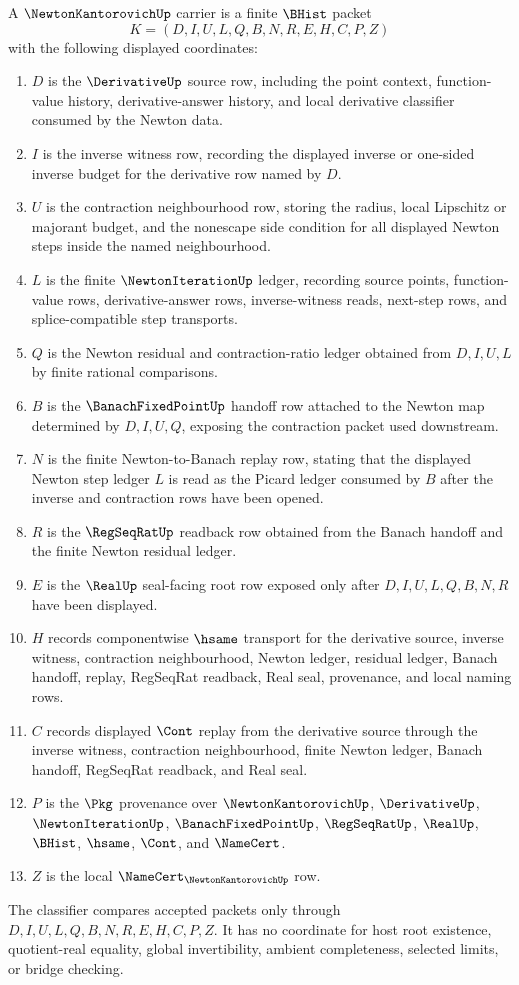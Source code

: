 \begin{definition}
\label{def:newton-kantorovich-carrier}
A $\NewtonKantorovichUp$ carrier is a finite $\BHist$ packet
$$
K=(D,I,U,L,Q,B,N,R,E,H,C,P,Z)
$$
with the following displayed coordinates:
\begin{enumerate}
\item $D$ is the $\DerivativeUp$ source row, including the point context, function-value history, derivative-answer history, and local derivative classifier consumed by the Newton data.
\item $I$ is the inverse witness row, recording the displayed inverse or one-sided inverse budget for the derivative row named by $D$.
\item $U$ is the contraction neighbourhood row, storing the radius, local Lipschitz or majorant budget, and the nonescape side condition for all displayed Newton steps inside the named neighbourhood.
\item $L$ is the finite $\NewtonIterationUp$ ledger, recording source points, function-value rows, derivative-answer rows, inverse-witness reads, next-step rows, and splice-compatible step transports.
\item $Q$ is the Newton residual and contraction-ratio ledger obtained from $D,I,U,L$ by finite rational comparisons.
\item $B$ is the $\BanachFixedPointUp$ handoff row attached to the Newton map determined by $D,I,U,Q$, exposing the contraction packet used downstream.
\item $N$ is the finite Newton-to-Banach replay row, stating that the displayed Newton step ledger $L$ is read as the Picard ledger consumed by $B$ after the inverse and contraction rows have been opened.
\item $R$ is the $\RegSeqRatUp$ readback row obtained from the Banach handoff and the finite Newton residual ledger.
\item $E$ is the $\RealUp$ seal-facing root row exposed only after $D,I,U,L,Q,B,N,R$ have been displayed.
\item $H$ records componentwise $\hsame$ transport for the derivative source, inverse witness, contraction neighbourhood, Newton ledger, residual ledger, Banach handoff, replay, RegSeqRat readback, Real seal, provenance, and local naming rows.
\item $C$ records displayed $\Cont$ replay from the derivative source through the inverse witness, contraction neighbourhood, finite Newton ledger, Banach handoff, RegSeqRat readback, and Real seal.
\item $P$ is the $\Pkg$ provenance over $\NewtonKantorovichUp$, $\DerivativeUp$, $\NewtonIterationUp$, $\BanachFixedPointUp$, $\RegSeqRatUp$, $\RealUp$, $\BHist$, $\hsame$, $\Cont$, and $\NameCert$.
\item $Z$ is the local $\NameCert_{\NewtonKantorovichUp}$ row.
\end{enumerate}
The classifier compares accepted packets only through $D,I,U,L,Q,B,N,R,E,H,C,P,Z$. It has no coordinate for host root existence, quotient-real equality, global invertibility, ambient completeness, selected limits, or bridge checking.
\end{definition}
